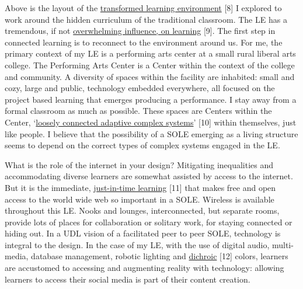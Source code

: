 Above is the layout of the
\href{http://www.scribd.com/doc/181089012/Transformed-Learning-Environment-Analysis}{transformed
learning environment} {{[}8{]}} I explored to work around the hidden
curriculum of the traditional classroom. The LE has a tremendous, if not
\href{http://scholar.lib.vt.edu/theses/available/etd-09232007-220306/unrestricted/SElmasryETDbodytext.pdf}{overwhelming
influence, on learning} {{[}9{]}}. The first step in connected learning
is to reconnect to the environment around us. For me, the primary
context of my LE is a performing arts center at a small rural liberal
arts college. The Performing Arts Center is a Center within the context
of the college and community. A diversity of spaces within the facility
are inhabited: small and cozy, large and public, technology embedded
everywhere, all focused on the project based learning that emerges
producing a performance. I stay away from a formal classroom as much as
possible. These spaces are Centers within the Center,
`\href{http://nourdiab.wordpress.com/2011/02/23/the-theories-of-christopher-alexander/}{loosely
connected adaptive complex systems}' {{[}10{]}} within themselves, just
like people. I believe that the possibility of a SOLE emerging as a
living structure seems to depend on the correct types of complex systems
engaged in the LE.

What is the role of the internet in your design? Mitigating inequalities
and accommodating diverse learners are somewhat assisted by access to
the internet. But it is the immediate,
\href{http://www.wordstream.com/blog/ws/2013/10/02/just-in-time-information-hacks}{just-in-time
learning} {{[}11{]}} that makes free and open access to the world wide
web so important in a SOLE. Wireless is available throughout this LE.
Nooks and lounges, interconnected, but separate rooms, provide lots of
places for collaboration or solitary work, for staying connected or
hiding out. In a UDL vision of a facilitated peer to peer SOLE,
technology is integral to the design. In the case of my LE, with the use
of digital audio, multi-media, database management, robotic lighting and
\href{http://en.wikipedia.org/wiki/Dichroic_filter}{dichroic} {{[}12{]}}
colors, learners are accustomed to accessing and augmenting reality with
technology: allowing learners to access their social media is part of
their content creation.


